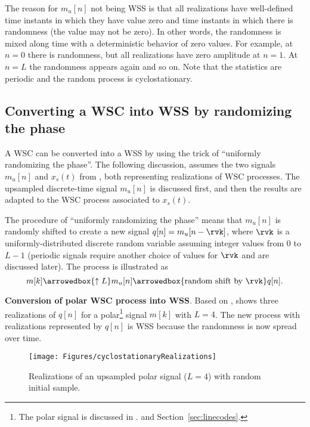 The reason for $m_u[n]$ not being WSS is that all realizations have well-defined time instants in which they have value zero and time instants in which there is randomness (the value may not be zero). In other words, the randomness is mixed along time with a deterministic behavior of zero values. For example, at $n=0$ there is randomness, but all realizations have zero amplitude at $n=1$. At $n=L$ the randomness appears again and so on. Note that the statistics are periodic and the random process is cyclostationary.

\subsection{Converting a WSC into WSS by randomizing the phase}
\label{sec:uniformRandomPhase}

A WSC can be converted into a WSS by using the trick of ``uniformly randomizing the phase''.
The following discussion, assumes the two signals $m_u[n]$ and $x_s(t)$ from ,
both representing realizations of WSC processes.
The upsampled discrete-time signal $m_u[n]$ is discussed first, and then the results
are adapted to the WSC process associated to $x_s(t)$.

The procedure of ``uniformly randomizing the phase'' means that $m_u[n]$ is randomly shifted to create a new signal $q[n] = m_u[n - \rvk]$, where $\rvk$ is a uniformly-distributed discrete random variable assuming integer values from 0 to $L-1$ (periodic signals require another choice of values for $\rvk$ and are discussed later). The process is illustrated as
\begin{equation}
m[k] \arrowedbox{\uparrow{L}} m_u[n] \arrowedbox{\mbox{random shift by } \rvk} q[n].
\label{eq:randomShiftTrick}
\end{equation}

\bExample \textbf{Conversion of polar WSC process into WSS}.
Based on ,  shows three realizations of $q[n]$ for a polar\footnote{The polar signal is discussed in 
\ifml
.
\else
and Section~\ref{sec:linecodes}.
\fi
}
signal $m[k]$ with $L=4$. 
 The new process with realizations represented by $q[n]$ is WSS because the randomness is now spread over time.

\begin{figure}[htbp]
\centering
\texttt{[image: Figures/cyclostationaryRealizations]}
\caption{Realizations of an upsampled polar signal ($L=4$) with random initial sample.\label{fig:cyclostationaryRealizations}}
\end{figure}

